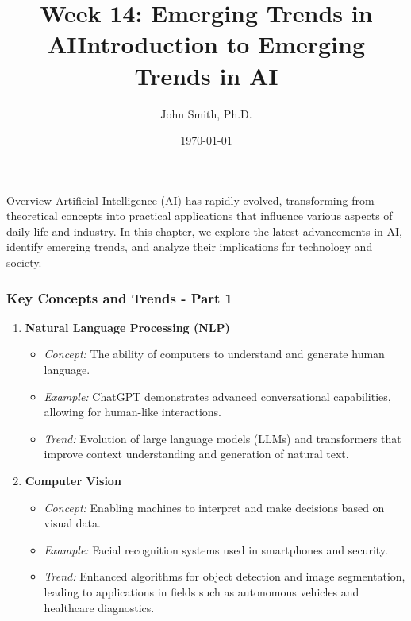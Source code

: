 \documentclass[aspectratio=169]{beamer}
\title[Emerging Trends in AI]{Week 14: Emerging Trends in AI}
\author[J. Smith]{John Smith, Ph.D.}
\institute[University Name]{
  Department of Computer Science\\
  University Name\\
  \vspace{0.3cm}
  Email: email@university.edu\\
  Website: www.university.edu
}
\date{\today}
\begin{document}
\frame{\titlepage}

\begin{frame}[fragile]
    \title{Introduction to Emerging Trends in AI}
    \begin{block}{Overview}
        Artificial Intelligence (AI) has rapidly evolved, transforming from theoretical concepts into practical applications that influence various aspects of daily life and industry. In this chapter, we explore the latest advancements in AI, identify emerging trends, and analyze their implications for technology and society.
    \end{block}
\end{frame}

\begin{frame}[fragile]
    \frametitle{Key Concepts and Trends - Part 1}
    \begin{enumerate}
        \item \textbf{Natural Language Processing (NLP)} 
        \begin{itemize}
            \item \textit{Concept:} The ability of computers to understand and generate human language.
            \item \textit{Example:} ChatGPT demonstrates advanced conversational capabilities, allowing for human-like interactions.
            \item \textit{Trend:} Evolution of large language models (LLMs) and transformers that improve context understanding and generation of natural text.
        \end{itemize}
        
        \item \textbf{Computer Vision}
        \begin{itemize}
            \item \textit{Concept:} Enabling machines to interpret and make decisions based on visual data.
            \item \textit{Example:} Facial recognition systems used in smartphones and security.
            \item \textit{Trend:} Enhanced algorithms for object detection and image segmentation, leading to applications in fields such as autonomous vehicles and healthcare diagnostics.
        \end{itemize}
    \end{enumerate}
\end{frame}
\end{document}
